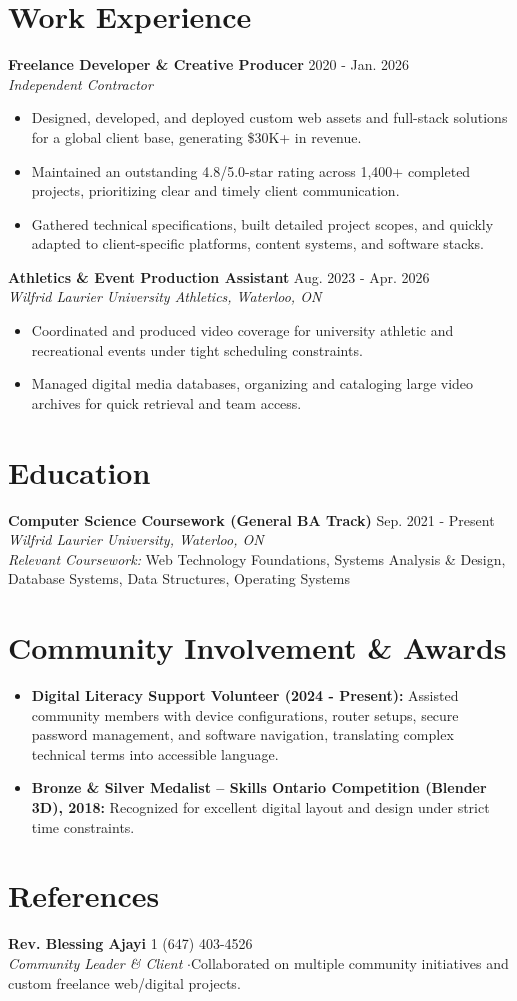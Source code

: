 \documentclass[a4paper,10pt]{article}
\begin{document}
\section*{Work Experience}
\textbf{Freelance Developer \& Creative Producer} \hfill 2020 - Jan. 2026 \\
\textit{Independent Contractor}
\begin{itemize}
    \item Designed, developed, and deployed custom web assets and full-stack solutions for a global client base, generating \$30K+ in revenue.
    \item Maintained an outstanding 4.8/5.0-star rating across 1,400+ completed projects, prioritizing clear and timely client communication.
    \item Gathered technical specifications, built detailed project scopes, and quickly adapted to client-specific platforms, content systems, and software stacks.
\end{itemize}

\vspace{3pt}
\textbf{Athletics \& Event Production Assistant} \hfill Aug. 2023 - Apr. 2026 \\
\textit{Wilfrid Laurier University Athletics, Waterloo, ON}
\begin{itemize}
    \item Coordinated and produced video coverage for university athletic and recreational events under tight scheduling constraints.
    \item Managed digital media databases, organizing and cataloging large video archives for quick retrieval and team access.
\end{itemize}

\section*{Education}
\textbf{Computer Science Coursework (General BA Track)} \hfill Sep. 2021 - Present \\
\textit{Wilfrid Laurier University, Waterloo, ON} \\
\textit{Relevant Coursework:} Web Technology Foundations, Systems Analysis \& Design, Database Systems, Data Structures, Operating Systems

\section*{Community Involvement \& Awards}
\begin{itemize}
    \item \textbf{Digital Literacy Support Volunteer (2024 - Present):} Assisted community members with device configurations, router setups, secure password management, and software navigation, translating complex technical terms into accessible language.
    \item \textbf{Bronze \& Silver Medalist -- Skills Ontario Competition (Blender 3D), 2018:} Recognized for excellent digital layout and design under strict time constraints.
\end{itemize}

\section*{References}
\textbf{Rev. Blessing Ajayi} \hfill 1 (647) 403-4526 \\
\textit{Community Leader \& Client} \enspace$\cdot$\enspace Collaborated on multiple community initiatives and custom freelance web/digital projects.
\end{document}

